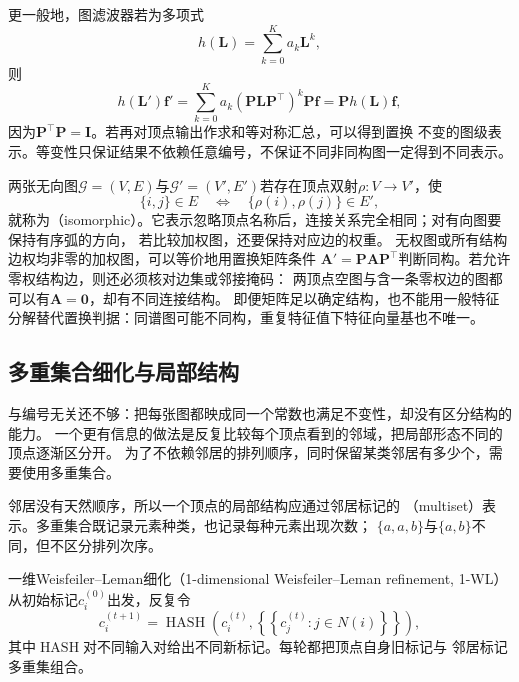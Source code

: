 更一般地，图滤波器若为多项式
\begin{equation}
  h(\bm{L})=\sum_{k=0}^{K}a_k\bm{L}^k,
  \label{eq:graph-theory-polynomial-filter}
\end{equation}
则
\[
  h(\bm{L}')\bm{f}'
  =\sum_{k=0}^{K}a_k(\bm{P}\bm{L}\bm{P}^{\top})^k\bm{P}\bm{f}
  =\bm{P}h(\bm{L})\bm{f},
\]
因为\(\bm{P}^{\top}\bm{P}=\bm{I}\)。若再对顶点输出作求和等对称汇总，可以得到置换
不变的图级表示。等变性只保证结果不依赖任意编号，不保证不同非同构图一定得到不同表示。

两张无向图\(\mathcal G=(V,E)\)与\(\mathcal G'=(V',E')\)若存在顶点双射\(\rho:V\to V'\)，使
\[
  \{i,j\}\in E\quad\Longleftrightarrow\quad\{\rho(i),\rho(j)\}\in E',
\]
就称为（isomorphic）。它表示忽略顶点名称后，连接关系完全相同；对有向图要保持有序弧的方向，
若比较加权图，还要保持对应边的权重。
无权图或所有结构边权均非零的加权图，可以等价地用置换矩阵条件
\(\bm A'=\bm P\bm A\bm P^\top\)判断同构。若允许零权结构边，则还必须核对边集或邻接掩码：
两顶点空图与含一条零权边的图都可以有\(\bm A=\bm0\)，却有不同连接结构。
即便矩阵足以确定结构，也不能用一般特征分解替代置换判据：同谱图可能不同构，重复特征值下特征向量基也不唯一。

\subsection{多重集合细化与局部结构}

与编号无关还不够：把每张图都映成同一个常数也满足不变性，却没有区分结构的能力。
一个更有信息的做法是反复比较每个顶点看到的邻域，把局部形态不同的顶点逐渐区分开。
为了不依赖邻居的排列顺序，同时保留某类邻居有多少个，需要使用多重集合。

邻居没有天然顺序，所以一个顶点的局部结构应通过邻居标记的
（multiset）表示。多重集合既记录元素种类，也记录每种元素出现次数；
\(\{a,a,b\}\)与\(\{a,b\}\)不同，但不区分排列次序。

\begin{definition}[一维邻域标记细化]
\label{def:graph-theory-wl-refinement}
一维Weisfeiler--Leman细化（1-dimensional Weisfeiler--Leman refinement,
1-WL）从初始标记\(c_i^{(0)}\)出发，反复令
\begin{equation}
  c_i^{(t+1)}=\operatorname{HASH}\left(
    c_i^{(t)},
    \left\{\!\left\{
      c_j^{(t)}:j\in N(i)
    \right\}\!\right\}
  \right),
  \label{eq:graph-theory-wl-refinement}
\end{equation}
其中\(\operatorname{HASH}\)对不同输入对给出不同新标记。每轮都把顶点自身旧标记与
邻居标记多重集组合。
\end{definition}

